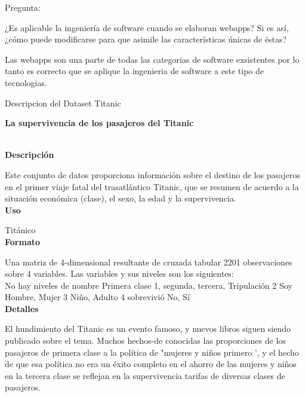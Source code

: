 \documentclass{report}
\begin{document}
\newpage
\normalsize{}
\begin{justify}

Pregunta:

¿Es aplicable la ingeniería de software cuando se elaboran webapps? Si es así, ¿cómo puede modificarse para que asimile las características únicas de éstas?




Las webapps son una parte de todas las categorias de software exsistentes por lo tanto es correcto que se aplique la ingenieria de software a este tipo de tecnologias.

\newpage

Descripcion del Dataset Titanic

\begin{center}\huge{}\textbf{La supervivencia de los pasajeros del Titanic\\ \ \\}\end{center}


\textbf{Descripción \\}

Este conjunto de datos proporciona información sobre el destino de los pasajeros en el primer viaje fatal del trasatlántico Titanic, que se resumen de acuerdo a la situación económica (clase), el sexo, la edad y la supervivencia.\\

\textbf{Uso\\}

  Titánico\\

\textbf{Formato\\}

Una matriz de 4-dimensional resultante de cruzada tabular 2201 observaciones sobre 4 variables. Las variables y sus niveles son los siguientes:\\

No hay niveles de nombre
Primera clase 1, segunda, tercera, Tripulación
2 Soy Hombre, Mujer
3 Niño, Adulto
4 sobrevivió No, Sí\\

\textbf{Detalles\\}

El hundimiento del Titanic es un evento famoso, y nuevos libros siguen siendo publicado sobre el tema. Muchos hechos-de conocidas las proporciones de los pasajeros de primera clase a la política de "mujeres y niños primero ', y el hecho de que esa política no era un éxito completo en el ahorro de las mujeres y niños en la tercera clase se reflejan en la supervivencia tarifas de diversas clases de pasajeros.\\


\end{justify}
\end{document}
